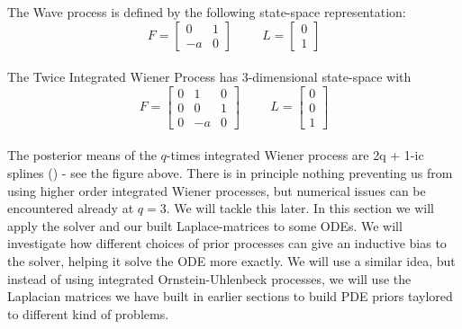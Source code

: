 {    The Wave process is defined by the following state-space representation:
    $$F=\begin{bmatrix}
        0 & 1 \\ -a & 0
    \end{bmatrix} \hspace{1cm} L=\begin{bmatrix}
        0 \\ 
        1 
    \end{bmatrix}$$
    \\ The Twice Integrated Wiener Process has 3-dimensional state-space with $$F=\begin{bmatrix}
        0 & 1 & 0 \\ 0 & 0 & 1 \\ 0 & -a & 0
    \end{bmatrix} \hspace{1cm} L=\begin{bmatrix}
        0 \\ 0 \\ 1
    \end{bmatrix}$$
    \\ The posterior means of the $q$-times integrated Wiener process are 2q + 1-ic splines (\cite{probnum}) - see the figure above. There is in principle nothing preventing us from using higher order integrated Wiener processes, but numerical issues can be encountered already at $q=3$. We will tackle this later.
}
\newpage
In this section we will apply the solver and our built Laplace-matrices to some ODEs. We will investigate how different choices of prior processes can give an inductive bias to the solver, helping it solve the ODE more exactly.
We will use a similar idea, but instead of using integrated Ornstein-Uhlenbeck processes, we will use the Laplacian matrices we have built in earlier sections to build PDE priors taylored to different kind of problems.
